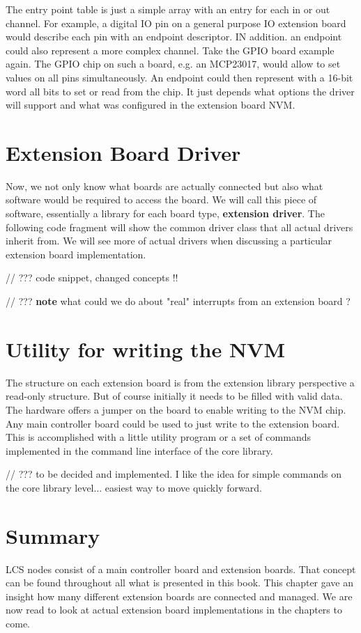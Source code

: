The entry point table is just a simple array with an entry for each in or out channel. For example, a digital IO pin on a general purpose IO extension board would describe each pin with an endpoint descriptor. IN addition. an endpoint could also represent a more complex channel. Take the GPIO board example again. The GPIO chip on such a board, e.g. an MCP23017, would allow to set values on all pins simultaneously. An endpoint could then represent with a 16-bit word all bits to set or read from the chip. It just depends what options the driver will support and what was configured in the extension board NVM.

\section{Extension Board Driver}

Now, we not only know what boards are actually connected but also what software would be required to access the board. We will call this piece of software, essentially a library for each board type, \textbf{extension driver}. The following code fragment will show the common driver class that all actual drivers inherit from. We will see more of actual drivers when discussing a particular extension board implementation.

// ??? code snippet, changed concepts !!

// ??? \textbf{note} what could we do about "real" interrupts from an extension board ?

\section{Utility for writing the NVM}

The structure on each extension board is from the extension library perspective a read-only structure. But of course initially it needs to be filled with valid data. The hardware offers a jumper on the board to enable writing to the NVM chip. Any main controller board could be used to just write to the extension board. This is accomplished with a little utility program or a set of commands implemented in the command line interface of the core library.

// ??? to be decided and implemented. I like the idea for simple commands on the core library level... easiest way to move quickly forward.

\section{Summary}

LCS nodes consist of a main controller board and extension boards. That concept can be found throughout all what is presented in this book. This chapter gave an insight how many different extension boards are connected and managed. We are now read to look at actual extension board implementations in the chapters to come.

